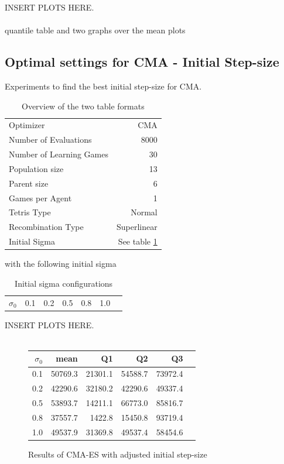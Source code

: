 INSERT PLOTS HERE.\\
\\
quantile table and two graphs over the mean plots

\clearpage

\subsection{Optimal settings for CMA - Initial Step-size}
Experiments to find the best initial step-size for CMA.

\begin{table}[h]
\centering
\caption{Overview of the two table formats}
\begin{tabular}{l r}
Optimizer & CMA\\
Number of Evaluations & 8000\\
Number of Learning Games &30\\
Population size& 13\\
Parent size & 6\\
Games per Agent & 1\\
Tetris Type & Normal\\
\hline
Recombination Type & Superlinear\\
Initial Sigma & See table \ref{InitialSigmaTest}
\end{tabular}
\end{table}

with the following initial sigma

\begin{table}[H]
\centering
\begin{tabular}{c | c c c c c c}
$\sigma_0$ & 0.1 & 0.2 & 0.5 & 0.8 & 1.0
\end{tabular}
\caption{Initial sigma configurations \label{InitialSigmaTest}}
\end{table}

INSERT PLOTS HERE.\\
\\


\begin{figure}[H]
\centering
\begin{tabular}{r | r r r r r}
$\sigma_0$ & mean & Q1 & Q2 & Q3\\
\hline
0.1 & 50769.3 & 21301.1 & 54588.7 & 73972.4\\
0.2 & 42290.6 & 32180.2 & 42290.6 & 49337.4\\
0.5 & 53893.7 & 14211.1 & 66773.0 & 85816.7\\
0.8 & 37557.7 & 1422.8  & 15450.8 & 93719.4\\
1.0 & 49537.9 & 31369.8 & 49537.4 & 58454.6
\end{tabular}
\caption{Results of CMA-ES with adjusted initial step-size \label{CMAInitialSigmaConfigTestAppendix}}
\end{figure}

